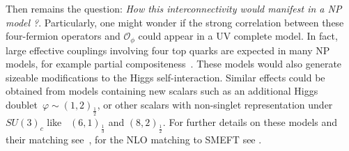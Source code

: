 Then remains the question: \textit{How this interconnectivity would manifest in a NP model ?}. Particularly, one might wonder if the strong correlation between these four-fermion operators and $\mathcal{O}_\phi$ could appear in a UV complete model. In fact, large effective couplings involving four top quarks are expected in many NP models, for example partial compositeness~\cite{Banelli:2020iau}. These models would also generate sizeable modifications to the Higgs self-interaction. Similar effects could be obtained from models containing new scalars such as an additional Higgs doublet~$\varphi\sim (1,2)_{\frac 12}$, or other scalars with non-singlet representation under $SU(3)_c$ like~ $(6,1)_{\frac 1 3}$ and $(8,2)_{\frac 1 2}$. For further details on these models and their matching see~\cite{deBlas:2017xtg}, for the NLO matching to SMEFT see \cite{Anisha:2021hgc}. 